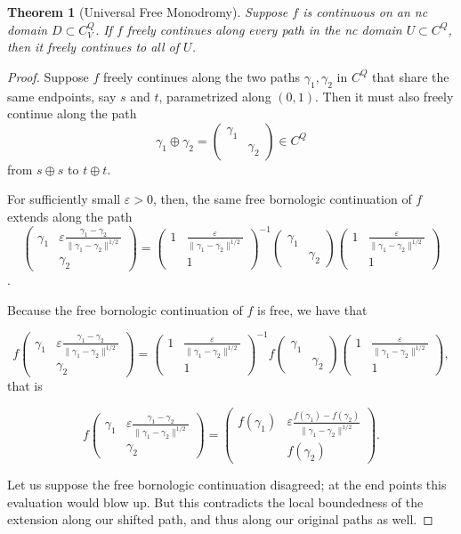 \documentclass[12pt]{amsart}
\newtheorem{theorem}{Theorem}[section]
\theoremstyle{definition}
\numberwithin{equation}{section}
\newcommand{\M}[1]{\begin{pmatrix}#1\end{pmatrix}}
\begin{document}
\begin{theorem}[Universal Free Monodromy]
\label{monodromy}
    Suppose $f$ is continuous on an nc domain $D \subset C^Q_V$. If $f$ freely continues along every path in the nc domain $U \subset C^Q$, then it freely continues to all of $U$. 
\end{theorem}
\begin{proof}
    Suppose $f$ freely continues along the two paths $\gamma_1, \gamma_2$ in $C^Q$ that share the same endpoints, say $s$ and $t$, parametrized along $(0,1)$. Then it must also freely continue along the path \[\gamma_1\oplus \gamma_2 = \M{\gamma_1 &\\&\gamma_2} \in C^Q\] from $s \oplus s$ to $t\oplus t$. 

    For sufficiently small $\varepsilon > 0$, then, the same free bornologic continuation of $f$ extends along the path \[\M{\gamma_1 & \varepsilon\frac{\gamma_1-\gamma_2}{\|\gamma_1 - \gamma_2\|^{1/2}}\\&\gamma_2} = \M{1 & \frac{\varepsilon}{\|\gamma_1 - \gamma_2\|^{1/2}}\\&1}^{-1}
    \M{\gamma_1 &\\&\gamma_2}
    \M{1 & \frac{\varepsilon}{\|\gamma_1 - \gamma_2\|^{1/2}}\\&1}\].

    Because the free bornologic continuation of $f$  is free, we have that

    \[f\M{\gamma_1 & \varepsilon\frac{\gamma_1-\gamma_2}{\|\gamma_1 - \gamma_2\|^{1/2}}\\&\gamma_2} = \M{1 & \frac{\varepsilon}{\|\gamma_1 - \gamma_2\|^{1/2}}\\&1}^{-1}
    f\M{\gamma_1 &\\&\gamma_2}
    \M{1 & \frac{\varepsilon}{\|\gamma_1 - \gamma_2\|^{1/2}}\\&1},\] that is 

    \[f\M{\gamma_1 & \varepsilon\frac{\gamma_1-\gamma_2}{\|\gamma_1 - \gamma_2\|^{1/2}}\\&\gamma_2} = \M{f(\gamma_1) & \varepsilon\frac{f(\gamma_1)-f(\gamma_2)}{\|\gamma_1 - \gamma_2\|^{1/2}}\\&f(\gamma_2)}.\]

    Let us suppose the free bornologic continuation disagreed; at the end points this evaluation would blow up. But this contradicts the local boundedness of the extension along our shifted path, and thus along our original paths as well.
\end{proof}
\end{document}
